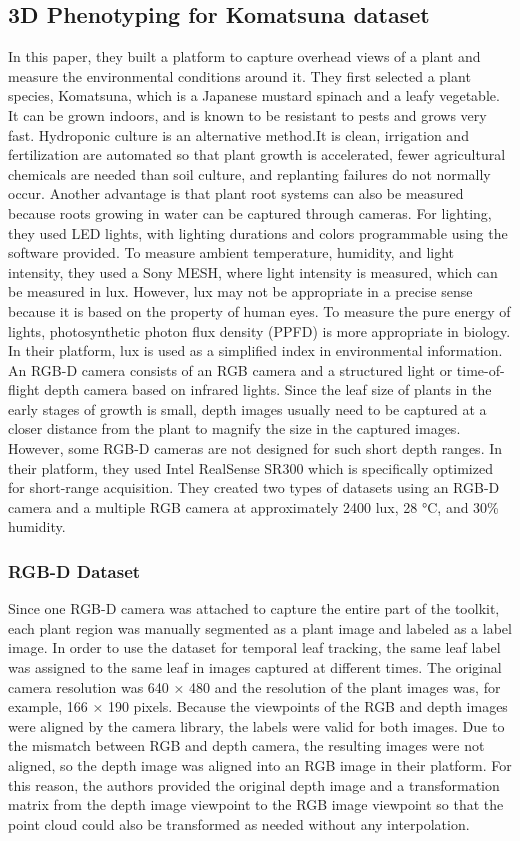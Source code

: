 \subsection{3D Phenotyping for Komatsuna dataset}
In this paper, they built a platform to capture overhead views of a plant and measure the environmental conditions around it. They first
selected a plant species, Komatsuna, which is a Japanese mustard spinach and a leafy vegetable. It can be grown indoors, and is known to
be resistant to pests and grows very fast. Hydroponic culture is an alternative method.It is clean, irrigation and fertilization are automated
so that plant growth is accelerated, fewer agricultural chemicals are needed than soil culture, and replanting failures do not normally occur.
Another advantage is that plant root systems can also be measured because roots growing in water can be captured through cameras. For lighting,
they used LED lights, with lighting durations and colors programmable using the software provided. To measure ambient temperature, humidity, and
light intensity, they used a Sony MESH, where light intensity is measured, which can be measured in lux. However, lux may not be appropriate in
a precise sense because it is based on the property of human eyes. To measure the pure energy of lights, photosynthetic photon flux density
(PPFD) is more appropriate in biology. In their platform, lux is used as a simplified index in environmental information. An RGB-D camera
consists of an RGB camera and a structured light or time-of-flight depth camera based on infrared lights. Since the leaf size of plants in the
early stages of growth is small, depth images usually need to be captured at a closer distance from the plant to magnify the size in the
captured images. However, some RGB-D cameras are not designed for such short depth ranges. In their platform, they used Intel RealSense SR300
which is specifically optimized for short-range acquisition.
They created two types of datasets using an RGB-D camera and a multiple RGB camera at approximately 2400 lux, 28 °C, and 30\% humidity.

\subsubsection{RGB-D Dataset}
Since one RGB-D camera was attached to capture the entire part of the toolkit, each plant region was manually segmented as a plant image
and labeled as a label image. In order to use the dataset for temporal leaf tracking, the same leaf label was assigned to the same leaf in
images captured at different times. The original camera resolution was 640 × 480 and the resolution of the plant images was, for example,
166 × 190 pixels. Because the viewpoints of the RGB and depth images were aligned by the camera library, the labels were valid for both images.
Due to the mismatch between RGB and depth camera, the resulting images were not aligned, so the depth image was aligned into an RGB image in their
platform. For this reason, the authors provided the original depth image and a transformation matrix from the depth image viewpoint to the RGB image
viewpoint so that the point cloud could also be transformed as needed without any interpolation.


